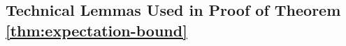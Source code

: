 \documentclass[letterpaper, 10 pt, conference]{ieeeconf}  %
\theoremstyle{definition}
\theoremstyle{plain}
\newtheorem{lemma}{Lemma}
\newcommand{\barf}{\overline{f}}
\newcommand{\xstar}{x^*}
\begin{document}
\subsection{\textbf{Technical Lemmas Used in Proof of Theorem \ref{thm:expectation-bound}}}
\end{document}

